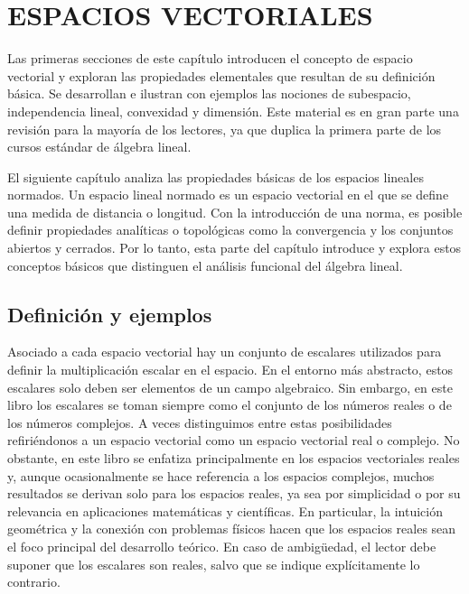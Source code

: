 \chapter{ESPACIOS VECTORIALES}
\printchaptertableofcontents


Las primeras secciones de este capítulo introducen el concepto de espacio vectorial y exploran las propiedades elementales que resultan de su definición básica. Se desarrollan e ilustran con ejemplos las nociones de subespacio, independencia lineal, convexidad y dimensión. Este material es en gran parte una revisión para la mayoría de los lectores, ya que duplica la primera parte de los cursos estándar de álgebra lineal.

El siguiente capítulo analiza las propiedades básicas de los espacios lineales normados. Un espacio lineal normado es un espacio vectorial en el que se define una medida de distancia o longitud. Con la introducción de una norma, es posible definir propiedades analíticas o topológicas como la convergencia y los conjuntos abiertos y cerrados. Por lo tanto, esta parte del capítulo introduce y explora estos conceptos básicos que distinguen el análisis funcional del álgebra lineal.

\section{Definición y ejemplos}

Asociado a cada espacio vectorial hay un conjunto de escalares utilizados para definir la multiplicación escalar en el espacio. En el entorno más abstracto, estos escalares solo deben ser elementos de un campo algebraico. Sin embargo, en este libro los escalares se toman siempre como el conjunto de los números reales o de los números complejos. A veces distinguimos entre estas posibilidades refiriéndonos a un espacio vectorial como un espacio vectorial real o complejo. No obstante, en este libro se enfatiza principalmente en los espacios vectoriales reales y, aunque ocasionalmente se hace referencia a los espacios complejos, muchos resultados se derivan solo para los espacios reales, ya sea por simplicidad o por su relevancia en aplicaciones matemáticas y científicas. En particular, la intuición geométrica y la conexión con problemas físicos hacen que los espacios reales sean el foco principal del desarrollo teórico. En caso de ambigüedad, el lector debe suponer que los escalares son reales, salvo que se indique explícitamente lo contrario.

